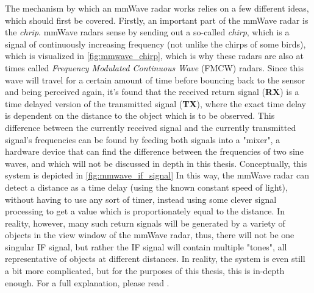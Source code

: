 The mechanism by which an mmWave radar works relies on a few different ideas, which should first be covered.
Firstly, an important part of the mmWave radar is the \textit{chrip}.
mmWave radars sense by sending out a so-called \textit{chirp}, which is a signal of continuously increasing frequency (not unlike the chirps of some birds), which is visualized in \cref{fig:mmwave_chirp}, which is why these radars are also at times called \textit{Frequency Modulated Continuous Wave} (FMCW) radars.
Since this wave will travel for a certain amount of time before bouncing back to the sensor and being perceived again, it's found that the received return signal (\textbf{RX}) is a time delayed version of the transmitted signal (\textbf{TX}), where the exact time delay is dependent on the distance to the object which is to be observed.
This difference between the currently received signal and the currently transmitted signal's frequencies can be found by feeding both signals into a "mixer", a hardware device that can find the difference between the frequencies of two sine waves, and which will not be discussed in depth in this thesis.
Conceptually, this system is depicted in \cref{fig:mmwave_if_signal}
In this way, the mmWave radar can detect a distance as a time delay (using the known constant speed of light), without having to use any sort of timer, instead using some clever signal processing to get a value which is proportionately equal to the distance.
In reality, however, many such return signals will be generated by a variety of objects in the view window of the mmWave radar, thus, there will not be one singular IF signal, but rather the IF signal will contain multiple "tones", all representative of objects at different distances.
In reality, the system is even still a bit more complicated, but for the purposes of this thesis, this is in-depth enough. 
For a full explanation, please read \cite{introduction_to_mmwave}.


